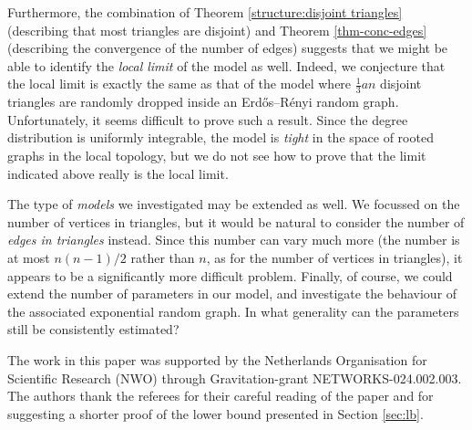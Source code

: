 \documentclass[bj,authoryear,noshowframe]{imsart}
\numberwithin{equation}{section}
\theoremstyle{plain}
\theoremstyle{definition}
\newcommand{\erdos}{Erd\H{o}s--R\'enyi random graph}
\begin{document}
Furthermore, the combination of Theorem \ref{structure:disjoint triangles} (describing that most triangles are disjoint) and Theorem \ref{thm-conc-edges} (describing the convergence of the number of edges) suggests that we might be able to identify the {\em local limit} of the model as well. Indeed, we conjecture that the local limit is exactly the same as that of the model where $\tfrac13 an$ disjoint triangles are randomly dropped inside an \erdos. Unfortunately, it seems difficult to prove such a result. Since the degree distribution is uniformly integrable, the model is {\em tight} in the space of rooted graphs in the local topology, but we do not see how to prove that the limit indicated above really is the local limit.

The type of {\em models} we investigated may be extended as well. We focussed on the number of vertices in triangles, but it would be natural to consider the number of {\em edges in triangles} instead. Since this number can vary much more (the number is at most $n(n-1)/2$ rather than $n$, as for the number of vertices in triangles), it appears to be a significantly more difficult problem. Finally, of course, we could extend the number of parameters in our model, and investigate the behaviour of the associated exponential random graph. In what generality can the parameters still be consistently estimated?

\begin{funding}
The work in this paper was supported by the Netherlands Organisation for Scientific Research (NWO) through Gravitation-grant NETWORKS-024.002.003. {The authors thank the referees for their careful reading of the paper and for suggesting a shorter proof of the lower bound presented in Section \ref{sec:lb}.}
\end{funding}




\end{document}
